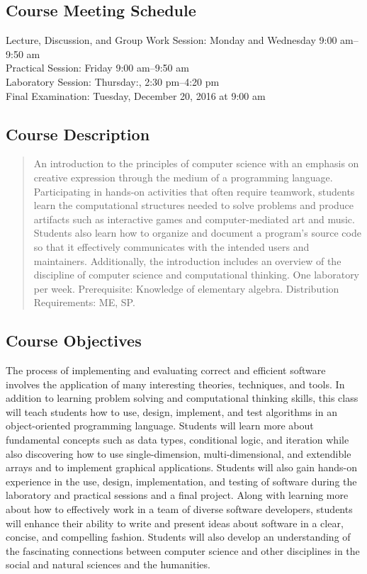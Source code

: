 \subsection*{Course Meeting Schedule}

Lecture, Discussion, and Group Work Session: Monday and Wednesday 9:00 am--9:50 am \\
Practical Session: Friday 9:00 am--9:50 am \\
Laboratory Session: Thursday:, 2:30 pm--4:20 pm \\
Final Examination: Tuesday, December 20, 2016 at 9:00 am

\subsection*{Course Description}

\begin{quote}

An introduction to the principles of computer science with an emphasis on creative expression through the medium of a
programming language. Participating in hands-on activities that often require teamwork, students learn the computational
structures needed to solve problems and produce artifacts such as interactive games and computer-mediated art and music.
Students also learn how to organize and document a program's source code so that it effectively communicates with the
intended users and maintainers. Additionally, the introduction includes an overview of the discipline of computer
science and computational thinking. One laboratory per week. Prerequisite: Knowledge of elementary algebra. Distribution
Requirements: ME, SP.\@ \\

\end{quote}

\subsection*{Course Objectives}

The process of implementing and evaluating correct and efficient software involves the application of many interesting
theories, techniques, and tools. In addition to learning problem solving and computational thinking skills, this class
will teach students how to use, design, implement, and test algorithms in an object-oriented programming language.
Students will learn more about fundamental concepts such as data types, conditional logic, and iteration while also
discovering how to use single-dimension, multi-dimensional, and extendible arrays and to implement graphical
applications.  Students will also gain hands-on experience in the use, design, implementation, and testing of software
during the laboratory and practical sessions and a final project.  Along with learning more about how to effectively
work in a team of diverse software developers, students will enhance their ability to write and present ideas about
software in a clear, concise, and compelling fashion.  Students will also develop an understanding of the fascinating
connections between computer science and other disciplines in the social and natural sciences and the humanities.

